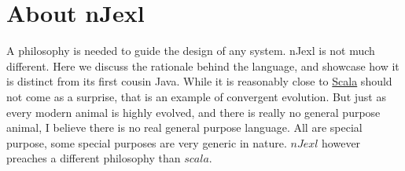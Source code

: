 \chapter{About nJexl}\label{nJexl}

{\LARGE A} philosophy is needed to guide the design of any system. nJexl is not much different.
Here we discuss the rationale behind the language, and showcase how it is distinct from its first cousin Java.
While it is reasonably close to \href{https://en.wikipedia.org/wiki/Scala\_(programming\_language)}{Scala} 
should not come as a surprise, that is an example of convergent evolution. 
But just as every modern animal is highly evolved, and there is really no general purpose animal,
I believe there is no real general purpose language. All are special purpose, some special purposes
are very generic in nature. $nJexl$ however preaches a different philosophy than $scala$.  


